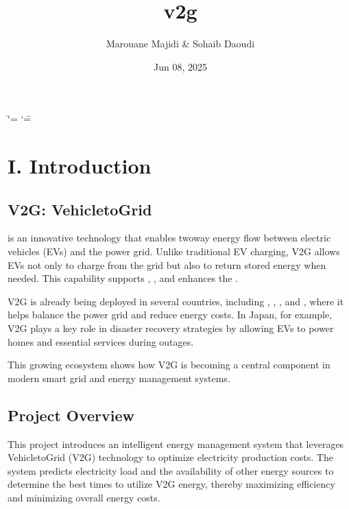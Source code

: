 \documentclass[letterpaper,10pt,english]{sphinxmanual}
\title{v2g}
\date{Jun 08, 2025}
\author{Marouane Majidi \& Sohaib Daoudi}
\begin{document}
\ifdefined\shorthandoff
  \ifnum\catcode`\=\string=\active\shorthandoff{=}\fi
  \ifnum\catcode`\"=\active{}\fi
\fi

\pagestyle{empty}
\sphinxmaketitle
\pagestyle{plain}
\sphinxtableofcontents
\pagestyle{normal}
\label{\detokenize{index::doc}}



\chapter{I. Introduction}
\label{\detokenize{index:i-introduction}}

\section{V2G: Vehicle\sphinxhyphen{}to\sphinxhyphen{}Grid}
\label{\detokenize{index:v2g-vehicle-to-grid}}

\sphinxAtStartPar
{} is an innovative technology that enables two\sphinxhyphen{}way energy flow between electric vehicles (EVs) and the power grid. Unlike traditional EV charging, V2G allows EVs not only to charge from the grid but also to return stored energy when needed. This capability supports , , and enhances the .

\sphinxAtStartPar
V2G is already being deployed in several countries, including , , , and , where it helps balance the power grid and reduce energy costs. In Japan, for example, V2G plays a key role in disaster recovery strategies by allowing EVs to power homes and essential services during outages.

\sphinxAtStartPar
This growing ecosystem shows how V2G is becoming a central component in modern smart grid and energy management systems.


\section{Project Overview}
\label{\detokenize{index:project-overview}}
\sphinxAtStartPar
This project introduces an intelligent energy management system that leverages Vehicle\sphinxhyphen{}to\sphinxhyphen{}Grid (V2G) technology to optimize electricity production costs. The system predicts electricity load and the availability of other energy sources to determine the best times to utilize V2G energy, thereby maximizing efficiency and minimizing overall energy costs.
\end{document}
